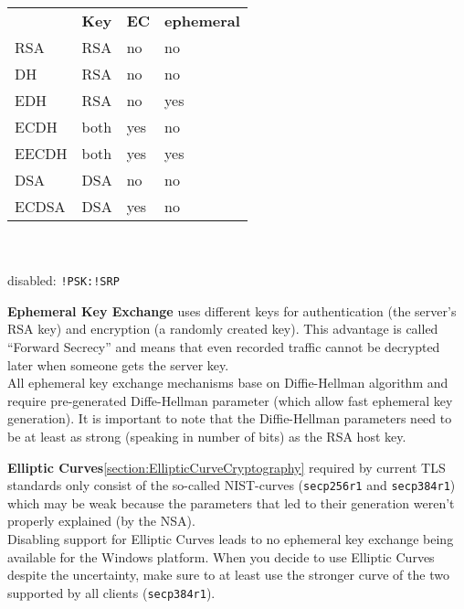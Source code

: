 \begin{WrapText}
\begin{tabular}{| l | l | l | l |}
    \toprule
 & \textbf{Key}  & \textbf{\cellcolor{orange}EC}  & \textbf{\cellcolor{green}ephemeral} \\ \cmidrule(lr){1-4}
    \cellcolor{red}    RSA   & RSA  & \cellcolor{green}no   & \cellcolor{red} no         \\
    \cellcolor{red}    DH    & RSA  & \cellcolor{green}no   & \cellcolor{red} no         \\
    \cellcolor{green}  EDH   & RSA  & \cellcolor{green}no   & \cellcolor{green} yes      \\
    \cellcolor{red}    ECDH  & both & \cellcolor{orange}yes & \cellcolor{red} no         \\
    \cellcolor{orange} EECDH & both & \cellcolor{orange}yes & \cellcolor{green} yes      \\
    \cellcolor{red}    DSA   & DSA  & \cellcolor{green}no   & \cellcolor{red} no         \\
    \cellcolor{red}    ECDSA & DSA  & \cellcolor{orange}yes & \cellcolor{red} no         \\
\bottomrule
\end{tabular}
\\
\\
disabled: \texttt{!PSK:!SRP}
\end{WrapText}

\textbf{Ephemeral Key Exchange} uses different keys for authentication (the server's RSA
key) and encryption (a randomly created key). This advantage is called ``Forward
Secrecy'' and means that even recorded traffic cannot be decrypted later when someone
gets the server key. \\
All ephemeral key exchange mechanisms base on Diffie-Hellman algorithm and require
pre-generated Diffe-Hellman parameter (which allow fast ephemeral key generation). It
is important to note that the Diffie-Hellman parameters need to be at least as strong
(speaking in number of bits) as the RSA host key. %


\textbf{Elliptic Curves}\ref{section:EllipticCurveCryptography} required by current TLS
standards only consist of the so-called NIST-curves (\texttt{secp256r1} and
\texttt{secp384r1}) which may be weak because the parameters that led to their generation
weren't properly explained (by the NSA). \\
Disabling support for Elliptic Curves leads to no ephemeral key exchange being available
for the Windows platform. When you decide to use Elliptic Curves despite the uncertainty,
make sure to at least use the stronger curve of the two supported by all clients
(\texttt{secp384r1}).


